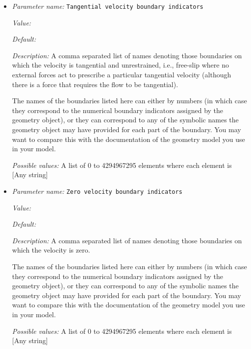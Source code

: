 \begin{itemize}
`zero velocity': Implementation of a model in which the boundary velocity is zero. This is commonly referred to as a ``stick boundary condition'', indicating that the material ``sticks'' to the material on the other side of the boundary.


{\it Possible values:} A key-value map of 0 to 4294967295 elements  where each key is [Any string] and each value is [Any one of ascii data, function, gplates, zero velocity]
\item {\it Parameter name:} {\tt Tangential velocity boundary indicators}
\label{parameters:Boundary velocity model/Tangential velocity boundary indicators}


{\it Value:} 


{\it Default:} 


{\it Description:} A comma separated list of names denoting those boundaries on which the velocity is tangential and unrestrained, i.e., free-slip where no external forces act to prescribe a particular tangential velocity (although there is a force that requires the flow to be tangential).

The names of the boundaries listed here can either by numbers (in which case they correspond to the numerical boundary indicators assigned by the geometry object), or they can correspond to any of the symbolic names the geometry object may have provided for each part of the boundary. You may want to compare this with the documentation of the geometry model you use in your model.


{\it Possible values:} A list of 0 to 4294967295 elements where each element is [Any string]
\item {\it Parameter name:} {\tt Zero velocity boundary indicators}
\label{parameters:Boundary velocity model/Zero velocity boundary indicators}


{\it Value:} 


{\it Default:} 


{\it Description:} A comma separated list of names denoting those boundaries on which the velocity is zero.

The names of the boundaries listed here can either by numbers (in which case they correspond to the numerical boundary indicators assigned by the geometry object), or they can correspond to any of the symbolic names the geometry object may have provided for each part of the boundary. You may want to compare this with the documentation of the geometry model you use in your model.


{\it Possible values:} A list of 0 to 4294967295 elements where each element is [Any string]
\end{itemize}




